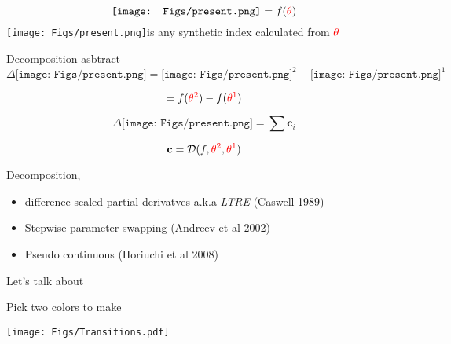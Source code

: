\documentclass[20pt,usenames,dvipsnames]{beamer}
\newcommand{\presentpic}{\texttt{[image: Figs/present.png]}}
\begin{document}

\begin{frame}[plain]
\Large
$$\presentpic = f(\color{red}\theta \color{black})$$
\vspace{1em}
 \presentpic \enspace is any synthetic index calculated from $\color{red}\theta$
 
\end{frame}


\begin{frame}[plain]{Decomposition asbtract}
\Large
$$ \Delta\presentpic = \presentpic^2 - \presentpic^1$$

$$ = f(\color{red}{\theta^2} \color{black}) - f(\color{red}{\theta^1} \color{black})$$

$$ \Delta\presentpic = \sum \mathbf{c}_i$$

$$ \mathbf{c} = \mathcal{D}(f, \color{red}{\theta^2}\color{black},\color{red}{\theta^1}\color{black})$$
\end{frame}


\begin{frame}[plain]{Decomposition, }
\begin{itemize}
\item difference-scaled partial derivatves a.k.a \emph{LTRE} (Caswell 1989)
\item Stepwise parameter swapping (Andreev et al 2002)
\item Pseudo continuous (Horiuchi et al 2008)
\end{itemize}

\end{frame}


\begin{frame}[plain]

\Huge
\centering
Let's talk about \scalebox{2}{\color{red}$\theta$}

\end{frame}


\begin{frame}[plain]

\Large
Pick two colors to make \scalebox{1.5}{\color{red}$\theta$}

\begin{center}
\texttt{[image: Figs/Transitions.pdf]}
\end{center}
\end{frame}
\end{document}
